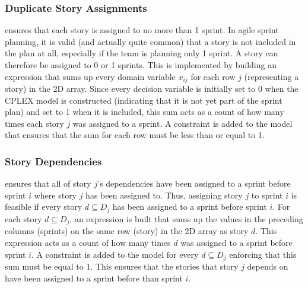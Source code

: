 \subsubsection{Duplicate Story Assignments}
 ensures that each story is assigned to no more than 1 sprint. In agile sprint planning, it is valid (and actually quite common) that a story is not included in the plan at all, especially if the team is planning only 1 sprint. A story can therefore be assigned to 0 or 1 sprints. This is implemented by building an expression that sums up every domain variable $x_{ij}$ for each row $j$ (representing a story) in the 2D array. Since every decision variable is initially set to 0 when the CPLEX model is constructed (indicating that it is not yet part of the sprint plan) and set to 1 when it is included, this sum acts as a count of how many times each story $j$ was assigned to a sprint. A constraint is added to the model that ensures that the sum for each row must be less than or equal to 1.

\subsubsection{Story Dependencies}
 ensures that all of story $j$'s dependencies have been assigned to a sprint before sprint $i$ where story $j$ has been assigned to. Thus, assigning story $j$ to sprint $i$ is feasible if every story $d \subseteq D_j$ has been assigned to a sprint before sprint $i$. For each story $d \subseteq D_j$, an expression is built that sums up the values in the preceding columns (sprints) on the same row (story) in the 2D array as story $d$. This expression acts as a count of how many times $d$ was assigned to a sprint before sprint $i$. A constraint is added to the model for every $d \subseteq D_j$ enforcing that this sum must be equal to 1. This ensures that the stories that story $j$ depends on have been assigned to a sprint before than sprint $i$.

